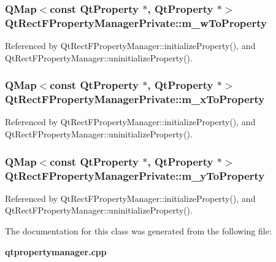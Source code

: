 \subsubsection[{m\+\_\+w\+To\+Property}]{\setlength{\rightskip}{0pt plus 5cm}Q\+Map$<$const {\bf Qt\+Property} $\ast$, {\bf Qt\+Property} $\ast$$>$ Qt\+Rect\+F\+Property\+Manager\+Private\+::m\+\_\+w\+To\+Property}\label{classQtRectFPropertyManagerPrivate_ab3958ad05b8ee25a05cd4a73b3706ca5}


Referenced by Qt\+Rect\+F\+Property\+Manager\+::initialize\+Property(), and Qt\+Rect\+F\+Property\+Manager\+::uninitialize\+Property().

\subsubsection[{m\+\_\+x\+To\+Property}]{\setlength{\rightskip}{0pt plus 5cm}Q\+Map$<$const {\bf Qt\+Property} $\ast$, {\bf Qt\+Property} $\ast$$>$ Qt\+Rect\+F\+Property\+Manager\+Private\+::m\+\_\+x\+To\+Property}\label{classQtRectFPropertyManagerPrivate_a1919f327977cbc8e5e8c5f63552452bd}


Referenced by Qt\+Rect\+F\+Property\+Manager\+::initialize\+Property(), and Qt\+Rect\+F\+Property\+Manager\+::uninitialize\+Property().

\subsubsection[{m\+\_\+y\+To\+Property}]{\setlength{\rightskip}{0pt plus 5cm}Q\+Map$<$const {\bf Qt\+Property} $\ast$, {\bf Qt\+Property} $\ast$$>$ Qt\+Rect\+F\+Property\+Manager\+Private\+::m\+\_\+y\+To\+Property}\label{classQtRectFPropertyManagerPrivate_a42cf996789a0541076f40879bf6fd98a}


Referenced by Qt\+Rect\+F\+Property\+Manager\+::initialize\+Property(), and Qt\+Rect\+F\+Property\+Manager\+::uninitialize\+Property().



The documentation for this class was generated from the following file\+:\begin{DoxyCompactItemize}
\item 
{\bf qtpropertymanager.\+cpp}\end{DoxyCompactItemize}

